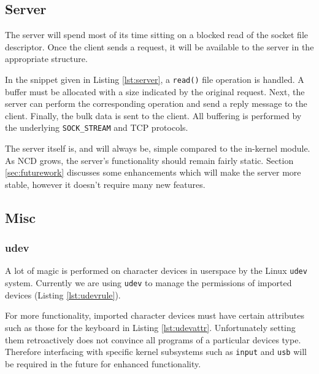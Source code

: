 \documentclass[11pt,twocolumn]{article}
\begin{document}
\subsection{Server}



The server will spend most of its time sitting on a blocked read of the
socket file descriptor. Once the client sends a request, it will be
available to the server in the appropriate structure.

In the snippet given in Listing \ref{lst:server}, a \texttt{read()} file
operation is handled. A buffer must be allocated with a size
indicated by the original request. Next, the server can perform the
corresponding operation and send a reply message to the client. Finally,
the bulk data is sent to the client. All buffering is performed by the
underlying \texttt{SOCK\_STREAM} and TCP protocols.

The server itself is, and will always be, simple compared to the
in-kernel module. As NCD grows, the server's functionality should remain
fairly static. Section \ref{sec:futurework} discusses some enhancements
which will make the server more stable, however it doesn't require many
new features.

\subsection{Misc}

\subsubsection{udev}
\label{subsec:udev}



A lot of magic is performed on character devices in userspace by
the Linux \texttt{udev} system.
Currently we are using \texttt{udev} to manage the
permissions of imported devices (Listing \ref{lst:udevrule}).



For more functionality, imported character devices must have certain
attributes such as those for the keyboard in Listing \ref{lst:udevattr}.
Unfortunately setting them retroactively does not convince all programs
of a particular devices type. Therefore interfacing with specific kernel
subsystems such as \texttt{input} and \texttt{usb} will be required in
the future for enhanced functionality.
\end{document}
